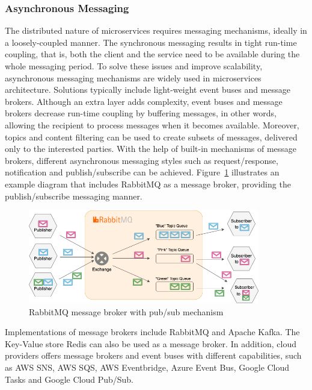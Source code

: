 \documentclass{Configuration_Files/PoliMi3i_thesis}
\begin{document}
\subsubsection{Asynchronous Messaging}
\label{subsubsec:async_msg}

The distributed nature of microservices requires messaging mechanisms, ideally in a loosely-coupled manner.
The synchronous messaging results in tight run-time coupling, that is, both the client and the service need to be available during the whole messaging period.
To solve these issues and improve scalability, asynchronous messaging mechanisms are widely used in microservices architecture.
Solutions typically include light-weight event buses and message brokers.
Although an extra layer adds complexity, event buses and message brokers decrease run-time coupling by buffering messages, in other words, allowing the recipient to process messages when it becomes available.
Moreover, topics and content filtering can be used to create subsets of messages, delivered only to the interested parties.
With the help of built-in mechanisms of message brokers, different asynchronous messaging styles such as request/response, notification and publish/subscribe can be achieved.
Figure~\ref{fig:rabbitmq} illustrates an example diagram that includes RabbitMQ as a message broker, providing the publish/subscribe messaging manner.

\begin{figure}[H]
    \centering
    \includegraphics[width=0.9\textwidth]{myImages/asynch_messaging.png}
    \caption{RabbitMQ message broker with pub/sub mechanism}
    \label{fig:rabbitmq}
\end{figure}

Implementations of message brokers include RabbitMQ and Apache Kafka.
The Key-Value store Redis can also be used as a message broker.
In addition, cloud providers offers message brokers and event buses with different capabilities, such as AWS SNS, AWS SQS, AWS Eventbridge, Azure Event Bus, Google Cloud Tasks and Google Cloud Pub/Sub.
\end{document}
